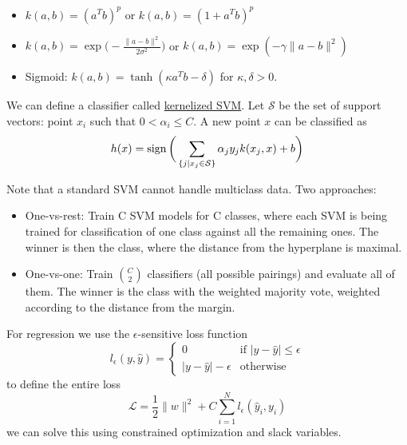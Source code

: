 \documentclass[12 pt]{article}        	%
\begin{document}
\begin{exmp}
    \begin{itemize}
        \item 
        $ k ( a , b ) = ( a^T b )^p $ or $ k ( a , b ) = ( 1 + a^T b )^p $

        \item 
        $ k ( a , b ) = \exp \bigg( - \frac{ \lVert a - b \rVert^2 }{ 2 \sigma^2 } \bigg) $ or $ k ( a , b ) = \exp ( - \gamma \lVert a - b \rVert^2 ) $

        \item 
        Sigmoid: $ k ( a , b ) = \tanh ( \kappa a^T b - \delta ) $ for $ \kappa, \delta > 0 $.
    \end{itemize}
\end{exmp}

\begin{lem}
    We can define a classifier called \underline{kernelized SVM}.
    Let $ \mathcal{ S } $ be the set of support vectors: point $ x_i $ such that $ 0 < \alpha_i \leq C $. A new point $ x $ can be classified as 
    \[
        h ( x )
        =
        \operatorname{sign} \bigg( \sum_{ \{ j \mid x_j \in \mathcal{ S } \} } \alpha_j y_j k ( x_j , x ) + b \bigg)
    \] 
\end{lem}

Note that a standard SVM cannot handle multiclass data.
Two approaches:
\begin{itemize}
    \item 
    One-vs-rest:
    Train C SVM models for C classes, where each SVM is being trained
    for classification of one class against all the remaining ones. The winner is then
    the class, where the distance from the hyperplane is maximal.

    \item 
    One-vs-one: Train $ \binom{ C }{ 2 }$ classifiers (all possible pairings) and evaluate all of them.
    The winner is the class with the weighted majority vote, weighted according to the
    distance from the margin.
\end{itemize}

For regression we use the $\epsilon$-sensitive loss function 
\[
    l_{ \epsilon } ( y , \hat{ y } ) = 
    \begin{cases}
        0 & \text{if } \lvert y - \hat{ y } \rvert \leq \epsilon
        \\
        \lvert y - \hat{ y } \rvert - \epsilon & \text{otherwise}
    \end{cases}
\]
to define the entire loss
\[
    \mathcal{ L } 
    = 
    \frac{1}{2}
    \lVert w \rVert^2 + C \sum_{ i = 1 }^N l_\epsilon ( \hat{y}_i , y_i )
\]
we can solve this using constrained optimization and slack variables.
\end{document}
